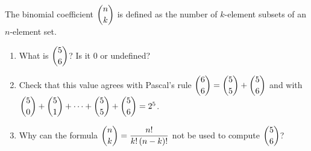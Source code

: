 The binomial coefficient $\dbinom nk$ is defined as the number of $k$-element subsets of an $n$-element set.
\begin{enumerate}
\item[(a)] What is $\dbinom56$? Is it $0$ or undefined?
\item[(b)] Check that this value agrees with Pascal's rule $\dbinom66=\dbinom55+\dbinom56$ and with $\dbinom50+\dbinom51+\cdots+\dbinom55+\dbinom56=2^5$.
\item[(c)] Why can the formula $\dbinom nk=\dfrac{n!}{k!\,(n-k)!}$ not be used to compute $\dbinom56$?
\end{enumerate}

